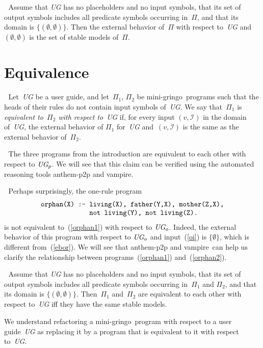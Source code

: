 \documentclass{new_tlp}
\def\beq{\begin{equation}}
\def\eeq#1{\label{#1}\end{equation}}
\def\ba{\begin{array}}
\def\ea{\end{array}}
\def\gringo{{\sc gringo}}
\def\vampire{{\sc vampire}}
\newcommand{\I}{\mathcal{I}}
\begin{document}
\medskip{}$\;$
Assume that \emph{UG} has no placeholders and no input symbols,
that its set of output symbols includes all predicate symbols occurring
in~$\Pi$, and that its domain is $\{(\emptyset,\emptyset)\}$.  Then
the external
behavior of~$\Pi$ with respect to~\emph{UG} and $(\emptyset,\emptyset)$
is the set of stable models of~$\Pi$.

\section{Equivalence}

$\;$
Let~\emph{UG} be a user guide, and let~$\Pi_1$, $\Pi_2$ be mini-\gringo\
programs such that the heads of their rules do not contain input symbols
of~\emph{UG}.  We say that~$\Pi_1$ is \emph{equivalent to~$\Pi_2$ with
respect to}~\emph{UG} if, for every input $(v,\I)$ in the domain of~\emph{UG},
the external behavior of $\Pi_1$ for~\emph{UG} and~$(v,\I)$ is the
same as the external behavior of~$\Pi_2$.

\medskip{}$\;$ The three programs from the
introduction are equivalent to each other with respect to $\emph{UG}_p$.
We will see that this claim can be verified using the automated reasoning
tools {\sc anthem-p2p} and \vampire.

\medskip{}$\;$ Perhaps surprisingly,
the one-rule program
\beq\ba l
\verb|orphan(X) :- living(X), father(Y,X), mother(Z,X),|\\
\verb|             not living(Y), not living(Z).|
\ea\eeq{orphan2}
is not equivalent to~(\ref{orphan1}) with respect to $\emph{UG}_o$.
Indeed, the external behavior of this program with respect
to $\emph{UG}_o$ and input~(\ref{oi}) is $\{\emptyset\}$, which
is different from~(\ref{ebor}).  We will see
that {\sc anthem-p2p} and \vampire\
can help us clarify the relationship between
programs~(\ref{orphan1}) and~(\ref{orphan2}).

\medskip{}$\;$
Assume that \emph{UG} has no placeholders and no input symbols,
that its set of output symbols includes all predicate symbols occurring
in~$\Pi_1$ and $\Pi_2$, and that its domain is $\{(\emptyset,\emptyset)\}$.
Then~$\Pi_1$ and~$\Pi_2$ are equivalent to each other with
respect to~\emph{UG} iff they have the same stable models.

\medskip
We understand refactoring a mini-\gringo\ program with respect to a
  user guide~\emph{UG} as replacing it by a program that is equivalent
  to it with respect to~\emph{UG}.
\end{document}
